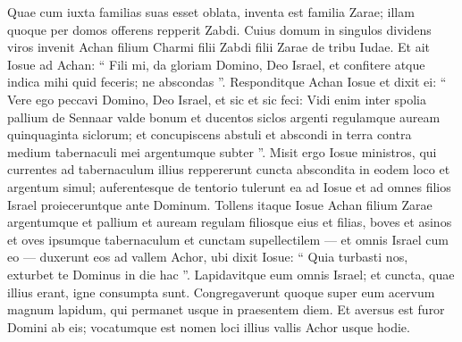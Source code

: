 \begin{biblechapter}
\begin{biblechapter}
\begin{biblechapter}
\begin{biblechapter}
\begin{biblechapter}
\begin{biblechapter}
\begin{biblechapter}
\verse Quae cum iuxta familias suas esset oblata, inventa est familia Zarae; illam quoque per domos offerens repperit Zabdi. 
\verse Cuius domum in singulos dividens viros invenit Achan filium Charmi filii Zabdi filii Zarae de tribu Iudae. 
\verse Et ait Iosue ad Achan: “ Fili mi, da gloriam Domino, Deo Israel, et confitere atque indica mihi quid feceris; ne abscondas ”. 
 \verse Responditque Achan Iosue et dixit ei: “ Vere ego peccavi Domino, Deo Israel, et sic et sic feci: 
\verse Vidi enim inter spolia pallium de Sennaar valde bonum et ducentos siclos argenti regulamque auream quinquaginta siclorum; et concupiscens abstuli et abscondi in terra contra medium tabernaculi mei argentumque subter ”. 
\verse Misit ergo Iosue ministros, qui currentes ad tabernaculum illius reppererunt cuncta abscondita in eodem loco et argentum simul; 
\verse auferentesque de tentorio tulerunt ea ad Iosue et ad omnes filios Israel proieceruntque ante Dominum.
 \verse Tollens itaque Iosue Achan filium Zarae argentumque et pallium et auream regulam filiosque eius et filias, boves et asinos et oves ipsumque tabernaculum et cunctam supellectilem — et omnis Israel cum eo — duxerunt eos ad vallem Achor, 
\verse ubi dixit Iosue: “ Quia turbasti nos, exturbet te Dominus in die hac ”. Lapidavitque eum omnis Israel; et cuncta, quae illius erant, igne consumpta sunt. 
\verse Congregaverunt quoque super eum acervum magnum lapidum, qui permanet usque in praesentem diem. Et aversus est furor Domini ab eis; vocatumque est nomen loci illius vallis Achor usque hodie.
 

\end{biblechapter}
\end{biblechapter}
\end{biblechapter}
\end{biblechapter}
\end{biblechapter}
\end{biblechapter}
\end{biblechapter}
